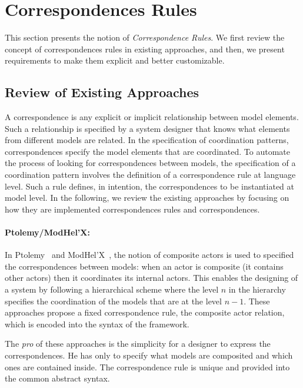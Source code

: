 \section{Correspondences Rules}
This section presents the notion of \emph{Correspondence Rules}. We first review the concept of correspondences rules in existing approaches, and then, we present requirements to make them explicit and better customizable.  

\subsection{Review of Existing Approaches}
A correspondence is any explicit or implicit relationship between model elements. Such a relationship is specified by a system designer that knows what elements from different models are related. In the specification of coordination patterns, correspondences specify the model elements that are coordinated. To automate the process of looking for correspondences between models, the specification of a coordination pattern involves the definition of a correspondence rule at language level. Such a rule defines, in intention, the correspondences to be instantiated at model level. In the following, we review the existing approaches by focusing on how they are implemented correspondences rules and correspondences.       

\paragraph{Ptolemy/ModHel'X: }
In Ptolemy~\cite{ptoleframebib} and ModHel'X~\cite{modhelxbib}, the notion of composite actors is used to specified the correspondences between models: when an actor is composite (\ie it contains other actors) then it coordinates its internal actors. This enables the designing of a system by following a hierarchical scheme where the level $n$ in the hierarchy specifies the coordination of the models that are at the level $n-1$. These approaches propose a fixed correspondence rule, \ie the composite actor relation, which is encoded into the syntax of the framework.

The \emph{pro} of these approaches is the simplicity for a designer to express the correspondences. He has only to specify what models are composited and which ones are contained inside. The correspondence rule is unique and provided into the common abstract syntax. 

